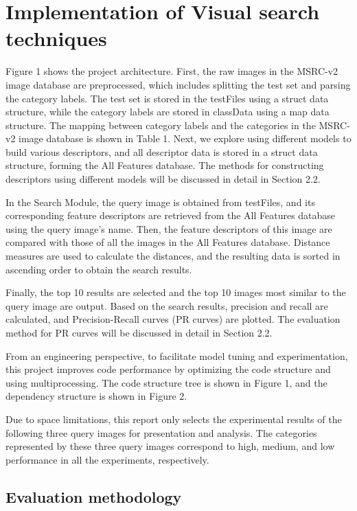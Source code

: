 \documentclass{article}
\begin{document}
\section{Implementation of Visual search techniques}

Figure 1 shows the project architecture.  First, the raw images in the MSRC-v2 image database are preprocessed, which includes splitting the test set and parsing the category labels. The test set is stored in the testFiles using a struct data structure, while the category labels are stored in classData using a map data structure. The mapping between category labels and the categories in the MSRC-v2 image database is shown in Table 1. Next, we explore using different models to build various descriptors, and all descriptor data is stored in a struct data structure, forming the All Features database. The methods for constructing descriptors using different models will be discussed in detail in Section 2.2.

In the Search Module, the query image is obtained from testFiles, and its corresponding feature descriptors are retrieved from the All Features database using the query image’s name. Then, the feature descriptors of this image are compared with those of all the images in the All Features database. Distance measures are used to calculate the distances, and the resulting data is sorted in ascending order to obtain the search results.

Finally, the top 10 results are selected and the top 10 images most similar to the query image are output. Based on the search results, precision and recall are calculated, and Precision-Recall curves (PR curves) are plotted. The evaluation method for PR curves will be discussed in detail in Section 2.2.

From an engineering perspective, to facilitate model tuning and experimentation, this project improves code performance by optimizing the code structure and using multiprocessing. The code structure tree is shown in Figure 1, and the dependency structure is shown in Figure 2.

Due to space limitations, this report only selects the experimental results of the following three query images for presentation and analysis. The categories represented by these three query images correspond to high, medium, and low performance in all the experiments, respectively.

\subsection{Evaluation methodology}
\end{document}
